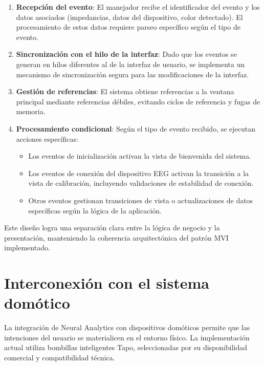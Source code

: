 \begin{enumerate}
    \item \textbf{Recepción del evento}: El manejador recibe el identificador del evento y los datos asociados (impedancias, datos del dispositivo, color detectado). El procesamiento de estos datos requiere parseo específico según el tipo de evento.
    
    \item \textbf{Sincronización con el hilo de la interfaz}: Dado que los eventos se generan en hilos diferentes al de la interfaz de usuario, se implementa un mecanismo de sincronización segura para las modificaciones de la interfaz.
    
    \item \textbf{Gestión de referencias}: El sistema obtiene referencias a la ventana principal mediante referencias débiles, evitando ciclos de referencia y fugas de memoria.
    
    \item \textbf{Procesamiento condicional}: Según el tipo de evento recibido, se ejecutan acciones específicas:
    \begin{itemize}
        \item Los eventos de inicialización activan la vista de bienvenida del sistema.
        \item Los eventos de conexión del dispositivo EEG activan la transición a la vista de calibración, incluyendo validaciones de estabilidad de conexión.
        \item Otros eventos gestionan transiciones de vista o actualizaciones de datos específicas según la lógica de la aplicación.
    \end{itemize}
\end{enumerate}

Este diseño logra una separación clara entre la lógica de negocio y la presentación, manteniendo la coherencia arquitectónica del patrón MVI implementado.

\section{Interconexión con el sistema domótico}

La integración de Neural Analytics con dispositivos domóticos permite que las intenciones del usuario se materialicen en el entorno físico. La implementación actual utiliza bombillas inteligentes Tapo, seleccionadas por su disponibilidad comercial y compatibilidad técnica.

